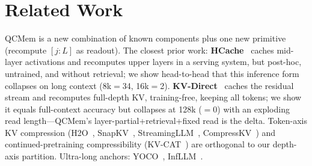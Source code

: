 \section{Related Work}
QCMem is a new combination of known components plus one new primitive
(recompute $[j{:}L]$ as readout). The closest prior work:
\textbf{HCache}~\citep{hcache} caches mid-layer activations and recomputes
upper layers in a serving system, but post-hoc, untrained, and without
retrieval; we show head-to-head that this inference form collapses on long
context (8k$=$34, 16k$=$2). \textbf{KV-Direct}~\citep{residualstream} caches
the residual stream and recomputes full-depth KV, training-free, keeping all
tokens; we show it equals full-context accuracy but collapses at 128k
($=0$) with an exploding read length---QCMem's layer-partial{+}retrieval{+}fixed
read is the delta. Token-axis KV compression (H2O~\citep{h2o},
SnapKV~\citep{snapkv}, StreamingLLM~\citep{streamingllm},
CompressKV~\citep{compresskv}) and continued-pretraining compressibility
(KV-CAT~\citep{kvcat}) are orthogonal to our depth-axis partition. Ultra-long
anchors: YOCO~\citep{yoco}, InfLLM~\citep{infllm}.

